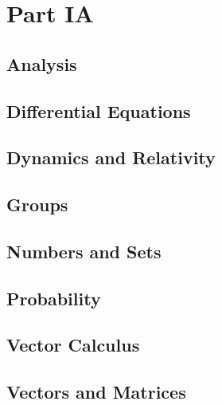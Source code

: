 \part{Part IA}

\chapter{Analysis}
\begingroup
\graphicspath{{../part-ia/analysis-i/}}


\endgroup
\chapter{Differential Equations}
\begingroup
\graphicspath{{../part-ia/differential-equations/}}


\endgroup
\chapter{Dynamics and Relativity}
\begingroup
\graphicspath{{../part-ia/dynamics-and-relativity/}}


\endgroup
\chapter{Groups}
\begingroup
\graphicspath{{../part-ia/groups/}}


\endgroup
\chapter{Numbers and Sets}
\begingroup
\graphicspath{{../part-ia/numbers-and-sets/}}


\endgroup
\chapter{Probability}
\begingroup
\graphicspath{{../part-ia/probability/}}


\endgroup
\chapter{Vector Calculus}
\begingroup
\graphicspath{{../part-ia/vector-calculus/}}


\endgroup
\chapter{Vectors and Matrices}
\begingroup
\graphicspath{{../part-ia/vectors-and-matrices/}}


\endgroup

